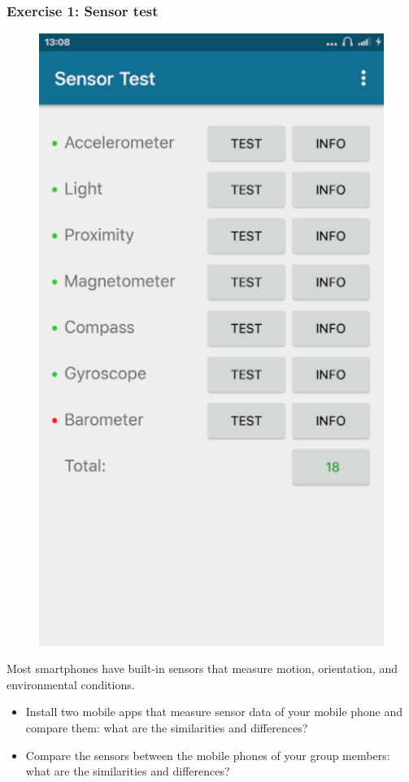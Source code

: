 \documentclass[screen, aspectratio=43]{beamer}
\begin{document}
\begin{frame}
  \frametitle{Exercise 1: Sensor test}
     \begin{figure}
	\includegraphics[scale=0.09]{img/sensor-test.png}
      \end{figure}
  {\scriptsize Most smartphones have built-in sensors that measure motion, orientation, and environmental conditions.
    \begin{itemize}
    	\item Install two mobile apps that measure sensor data of your mobile phone and compare them: what are the similarities and differences? %
	\item Compare the sensors between the mobile phones of your group members: what are the similarities and differences?

\end{itemize}}
\end{frame}
\end{document}

